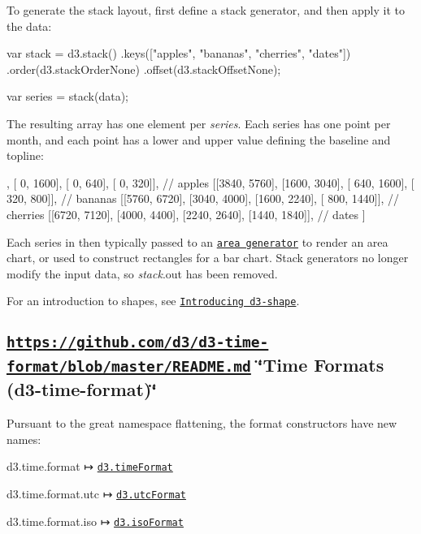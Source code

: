 To generate the stack layout, first define a stack generator, and then apply it to the data\+:


\begin{DoxyCode}
var stack = d3.stack()
    .keys(["apples", "bananas", "cherries", "dates"])
    .order(d3.stackOrderNone)
    .offset(d3.stackOffsetNone);

var series = stack(data);
\end{DoxyCode}


The resulting array has one element per {\itshape series}. Each series has one point per month, and each point has a lower and upper value defining the baseline and topline\+:


\begin{DoxyCode}
[
  [[   0, 3840], [   0, 1600], [   0,  640], [   0,  320]], // apples
  [[3840, 5760], [1600, 3040], [ 640, 1600], [ 320,  800]], // bananas
  [[5760, 6720], [3040, 4000], [1600, 2240], [ 800, 1440]], // cherries
  [[6720, 7120], [4000, 4400], [2240, 2640], [1440, 1840]], // dates
]
\end{DoxyCode}


Each series in then typically passed to an \href{https://github.com/d3/d3-shape/blob/master/README.md#areas}{\tt area generator} to render an area chart, or used to construct rectangles for a bar chart. Stack generators no longer modify the input data, so {\itshape stack}.out has been removed.

For an introduction to shapes, see \href{https://medium.com/@mbostock/introducing-d3-shape-73f8367e6d12}{\tt Introducing d3-\/shape}.

\subsection*{\href{https://github.com/d3/d3-time-format/blob/master/README.md}{\tt https\+://github.\+com/d3/d3-\/time-\/format/blob/master/\+R\+E\+A\+D\+M\+E.\+md} \char`\"{}\+Time Formats (d3-\/time-\/format)\char`\"{}}

Pursuant to the great namespace flattening, the format constructors have new names\+:


\begin{DoxyItemize}
\item d3.\+time.\+format ↦ \href{https://github.com/d3/d3-time-format/blob/master/README.md#timeFormat}{\tt d3.\+time\+Format}
\item d3.\+time.\+format.\+utc ↦ \href{https://github.com/d3/d3-time-format/blob/master/README.md#utcFormat}{\tt d3.\+utc\+Format}
\item d3.\+time.\+format.\+iso ↦ \href{https://github.com/d3/d3-time-format/blob/master/README.md#isoFormat}{\tt d3.\+iso\+Format}
\end{DoxyItemize}

